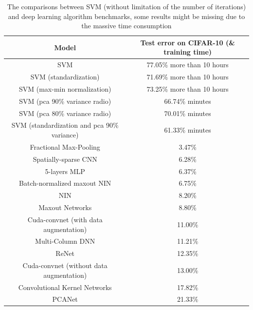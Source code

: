 \documentclass[12pt,a4paper]{article}
\theoremstyle{definition}
\begin{document}
\vspace{-0.015\linewidth}
\begin{table}[H]
	\renewcommand\arraystretch{1.25}
	\caption{The comparisons between SVM (without limitation of the number of iterations) and deep learning algorithm benchmarks, some results might be missing due to the massive time consumption}
	\label{tab:res}
	\centering
	
	\begin{tabular}{c|c}
		\centering
		Model & Test error on CIFAR-10 (\& training time) \\
		\hline
		\hline
		
		SVM & 77.05\% \quad more than 10 hours \\
		SVM (standardization) & 71.69\% \quad more than 10 hours \\
		SVM (max-min normalization) & 73.25\% \quad more than 10 hours \\
		SVM (pca 90\% variance radio) & 66.74\% \quad 21 minutes \\
		SVM (pca 80\% variance radio) & 70.01\% \quad 5 minutes \\
		SVM (standardization and pca 90\% variance) & 61.33\% \quad 16 minutes \\
		\hline
		Fractional Max-Pooling \cite{bench2} & 3.47\% \\
		Spatially-sparse CNN \cite{bench10} & 6.28\% \\
		5-layers MLP & 6.37\% \\
		Batch-normalized maxout NIN \cite{bench3} & 6.75\% \\
		NIN \cite{bench4} & 8.20\% \\
		Maxout Networks \cite{bench5} & 8.80\% \\
		Cuda-convnet \cite{bench1} (with data augmentation) & 11.00\% \\
		Multi-Column DNN \cite{bench6} & 11.21\% \\
		ReNet \cite{bench9} & 12.35\% \\
		Cuda-convnet (without data augmentation) & 13.00\% \\
		Convolutional Kernel Networks \cite{bench7} & 17.82\% \\
		PCANet \cite{bench8} & 21.33\% \\
	\end{tabular}
\end{table}
\end{document}
